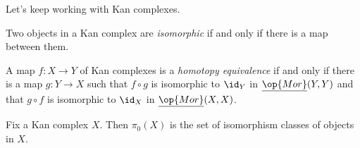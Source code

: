 \documentclass[../notes.tex]{subfiles}
\begin{document}
Let's keep working with Kan complexes.
\begin{definition}[isomorphism]
	Two objects in a Kan complex are \textit{isomorphic} if and only if there is a map between them.
\end{definition}
\begin{definition}[equivalence]
	A map $f\colon X\to Y$ of Kan complexes is a \textit{homotopy equivalence} if and only if there is a map $g\colon Y\to X$ such that $f\circ g$ is isomorphic to $\id_Y$ in $\underline{\op{Mor}}(Y,Y)$ and that $g\circ f$ is isomorphic to $\id_X$ in $\underline{\op{Mor}}(X,X)$.
\end{definition}
\begin{definition}
	Fix a Kan complex $X$. Then $\pi_0(X)$ is the set of isomorphism classes of objects in $X$.
\end{definition}
\end{document}
